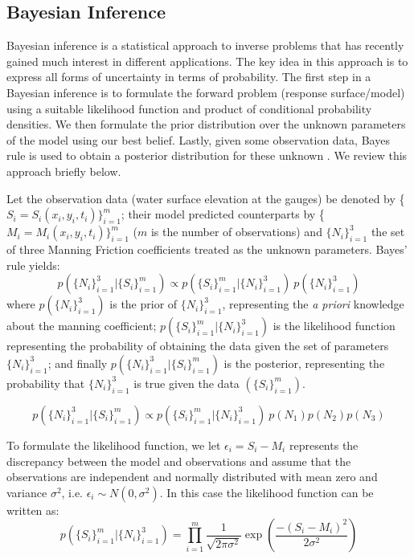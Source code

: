 \subsection{Bayesian Inference}
 \label{sec:inference}
Bayesian inference is a statistical approach to inverse problems
that has recently gained much interest in different applications.
The key idea in this approach is to express all forms of uncertainty
in terms of probability. The first step in a Bayesian inference 
is to formulate the forward problem (response surface/model) using 
a suitable likelihood function and product of conditional probability densities. 
We then formulate the prior distribution over the unknown parameters of the model
using our best belief. Lastly, given some observation data, Bayes rule 
is used to obtain a posterior distribution for these unknown
\citep{sivia}. We review this approach briefly below.

Let the observation data (water surface elevation at the gauges) be denoted by \{$S_i = S_i(x_i,y_i,t_i)\}_{i=1}^m$;
their model predicted counterparts by \{$M_i= M_i(x_i,y_i,t_i)\}_{i=1}^m$
($m$ is the number of observations) and $\{N_i\}_{i=1}^3$ the set of 
three Manning Friction coefficients treated as the unknown parameters. 
Bayes' rule yields:
\begin{equation}
 p(\{N_i\}_{i=1}^3| \{S_i\}_{i=1}^m) \propto 
 p(\{S_i\}_{i=1}^m | \{N_i\}_{i=1}^3) \ p(\{N_i\}_{i=1}^3)  
\label{eq:bayes}
\end{equation}
where $p(\{N_i\}_{i=1}^3)$ is the prior of $\{N_i\}_{i=1}^3$, representing the \emph{a priori} knowledge
about the manning coefficient; 
$p(\{S_i\}_{i=1}^m | \{N_i\}_{i=1}^3)$ is the likelihood function representing
the probability of obtaining the data given the set of parameters $\{N_i\}_{i=1}^3$;
and finally $p(\{N_i\}_{i=1}^3| \{ S_i \}_{i=1}^m)$ is the posterior,
representing the probability that $\{N_i\}_{i=1}^3$ is true given the data $( \{ S_i \}_{i=1}^m )$.

\begin{equation}
p(\{N_i\}_{i=1}^3 | \{ S_i \}_{i=1}^m)
\propto 
p(\{S_i\}_{i=1}^m | \{N_i\}_{i=1}^3) \ p(N_1)p(N_2) p(N_3)  
\end{equation}

To formulate the likelihood function, we let 
	 $\epsilon_i = S_i - M_i $
represents the discrepancy between the model and observations 
and assume that the observations are independent
and normally distributed with mean
zero and variance $\sigma^2$, i.e. 
$\epsilon_i \sim N(0,\sigma^2)$. In this 
case the likelihood function can be written as:
\begin{equation} 
p(\{S_i\}_{i=1}^m |  \{N_i\}_{i=1}^3) 
= 
\prod_{i=1}^m  \frac{1}{\sqrt{2 \pi \sigma^2}} 
\exp \left( \frac{-(S_i - M_i)^2}{2 \sigma^2} \right)  	
\label{eq:likelihood}
\end{equation}

